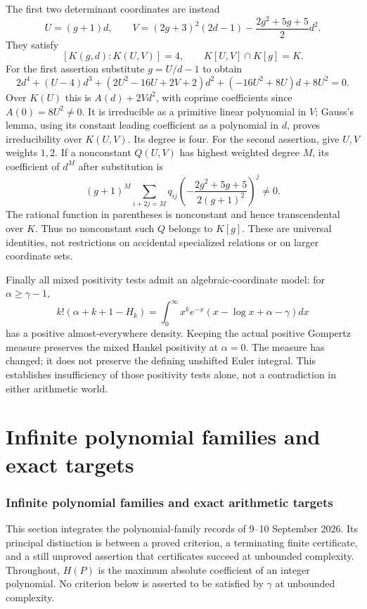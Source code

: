 \documentclass[11pt,a4paper]{article}
\theoremstyle{definition}
\theoremstyle{remark}
\numberwithin{equation}{section}
\begin{document}
The first two determinant coordinates are instead
\[
 U=(g+1)d,\qquad
 V=(2g+3)^2(2d-1)-\frac{2g^2+5g+5}{2}d^2.
\]
They satisfy
\begin{equation}\label{ar:compression}
 [K(g,d):K(U,V)]=4,\qquad K[U,V]\cap K[g]=K.
\end{equation}
For the first assertion substitute $g=U/d-1$ to obtain
\[
 2d^4+(U-4)d^3+(2U^2-16U+2V+2)d^2
       +(-16U^2+8U)d+8U^2=0.
\]
Over $K(U)$ this is $A(d)+2Vd^2$, with coprime coefficients since
$A(0)=8U^2\ne0$.  It is irreducible as a primitive linear polynomial in
$V$; Gauss's lemma, using its constant leading coefficient as a polynomial
in $d$, proves irreducibility over $K(U,V)$.  Its degree is four.
For the second assertion, give $U,V$ weights $1,2$.  If a nonconstant
$Q(U,V)$ has highest weighted degree $M$, its coefficient of $d^M$ after
substitution is
\[
 (g+1)^M\sum_{i+2j=M}q_{ij}
 \left(-\frac{2g^2+5g+5}{2(g+1)^2}\right)^j\ne0.
\]
The rational function in parentheses is nonconstant and hence
transcendental over $K$.  Thus no nonconstant such $Q$ belongs to $K[g]$.
These are universal identities, not restrictions on accidental specialized
relations or on larger coordinate sets.

Finally all mixed positivity tests admit an algebraic-coordinate model:
for $\alpha\ge\gamma-1$,
\[
 k!(\alpha+k+1-H_k)=\int_0^\infty x^ke^{-x}
                  (x-\log x+\alpha-\gamma)dx
\]
has a positive almost-everywhere density.  Keeping the actual positive
Gompertz measure preserves the mixed Hankel positivity at $\alpha=0$.
The measure has changed; it does not preserve the defining unshifted Euler
integral.  This establishes insufficiency of those positivity tests alone,
not a contradiction in either arithmetic world.


\clearpage
\part{Infinite polynomial families and exact targets}\label{master:infinite}
\section{Infinite polynomial families and exact arithmetic targets}
\label{inf:sec:families}

This section integrates the polynomial-family records of 9--10 September 2026. Its principal distinction is between a proved criterion, a terminating finite certificate, and a still unproved assertion that certificates succeed at unbounded complexity. Throughout, $H(P)$ is the maximum absolute coefficient of an integer polynomial. No criterion below is asserted to be satisfied by $\gamma$ at unbounded complexity.
\end{document}
